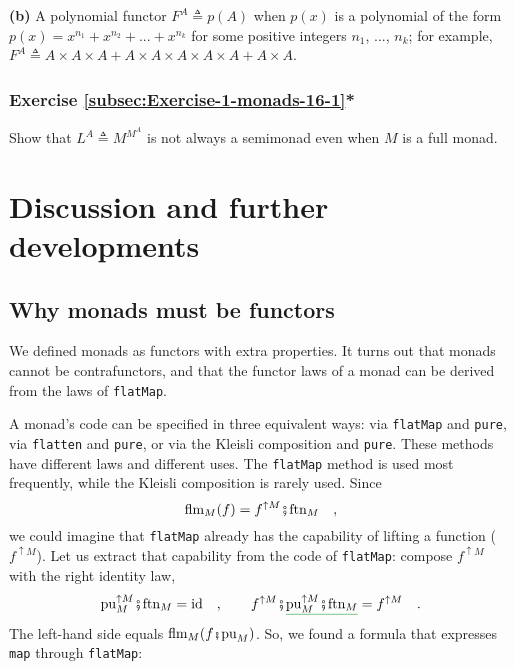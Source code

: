 \textbf{(b)} A polynomial functor $F^{A}\triangleq p(A)$ when $p(x)$
is a polynomial of the form $p(x)=x^{n_{1}}+x^{n_{2}}+...+x^{n_{k}}$
for some positive integers $n_{1}$, ..., $n_{k}$; for example, $F^{A}\triangleq A\times A\times A+A\times A\times A\times A\times A+A\times A$. 

\subsubsection{Exercise \label{subsec:Exercise-1-monads-16-1}\ref{subsec:Exercise-1-monads-16-1}{*}}

Show that $L^{A}\triangleq M^{M^{A}}$ is not always a semimonad even
when $M$ is a full monad.%
\begin{comment}
$M^{A}\triangleq\bbnum 1+A$ should be sufficient; show that $M\circ M\circ M$
is reduced to $M\circ M$ in two inequivalent ways.
\end{comment}


\section{Discussion and further developments}

\subsection{Why monads must be functors}

We defined monads as functors with extra properties. It turns out
that monads cannot be contrafunctors, and that the functor laws of
a monad can be derived from the laws of \lstinline!flatMap!.

A monad\textsf{'}s code can be specified in three equivalent ways: via \lstinline!flatMap!
and \lstinline!pure!, via \lstinline!flatten! and \lstinline!pure!,
or via the Kleisli composition and \lstinline!pure!. These methods
have different laws and different uses. The \lstinline!flatMap! method
is used most frequently, while the Kleisli composition is rarely used.
Since
\[
\text{flm}_{M}(f)=f^{\uparrow M}\bef\text{ftn}_{M}\quad,
\]
we could imagine that \lstinline!flatMap! already has the capability
of lifting a function ($f^{\uparrow M}$). Let us extract that capability
from the code of \lstinline!flatMap!: compose $f^{\uparrow M}$ with
the right identity law,
\[
\text{pu}_{M}^{\uparrow M}\bef\text{ftn}_{M}=\text{id}\quad,\quad\quad f^{\uparrow M}\bef\gunderline{\text{pu}_{M}^{\uparrow M}\bef\text{ftn}_{M}}=f^{\uparrow M}\quad.
\]
The left-hand side equals $\text{flm}_{M}(f\bef\text{pu}_{M})$. So,
we found a formula that expresses \lstinline!map! through \lstinline!flatMap!:

